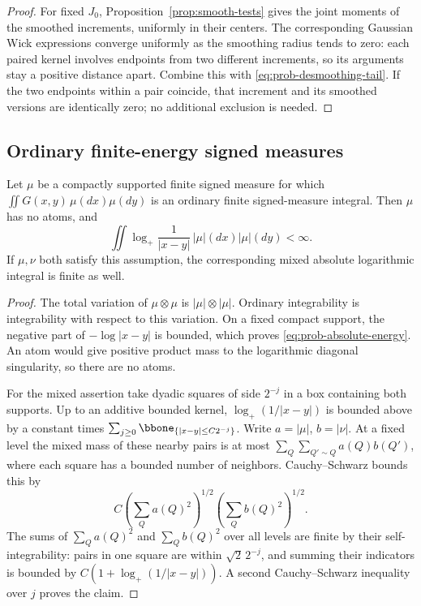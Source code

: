 \begin{proof}
For fixed \(J_0\), Proposition~\ref{prop:smooth-tests} gives the joint
moments of the smoothed increments, uniformly in their centers.
The corresponding Gaussian Wick expressions converge uniformly as the
smoothing radius tends to zero: each paired kernel involves endpoints
from two different increments, so its arguments stay a positive
distance apart. Combine this with \eqref{eq:prob-desmoothing-tail}.
If the two endpoints within a pair coincide, that increment and its
smoothed versions are identically zero; no additional exclusion is
needed.
\end{proof}

\subsection{Ordinary finite-energy signed measures}

\begin{lemma}\label{lem:log-integrability}
Let \(\mu\) be a compactly supported finite signed measure for which
\(\iint G(x,y)\,\mu(dx)\mu(dy)\) is an ordinary finite signed-measure
integral. Then \(\mu\) has no atoms, and
\begin{equation}\label{eq:prob-absolute-energy}
 \iint\log_+\frac1{|x-y|}\,|\mu|(dx)|\mu|(dy)<\infty.
\end{equation}
If \(\mu,\nu\) both satisfy this assumption, the corresponding mixed
absolute logarithmic integral is finite as well.
\end{lemma}

\begin{proof}
The total variation of \(\mu\otimes\mu\) is
\(|\mu|\otimes|\mu|\). Ordinary integrability is integrability with
respect to this variation. On a fixed compact support, the negative
part of \(-\log|x-y|\) is bounded, which proves
\eqref{eq:prob-absolute-energy}. An atom would give positive product
mass to the logarithmic diagonal singularity, so there are no atoms.

For the mixed assertion take dyadic squares of side \(2^{-j}\) in a
box containing both supports. Up to an additive bounded kernel,
\(\log_+(1/|x-y|)\) is bounded above by a constant times
\(\sum_{j\ge0}\bbone_{\{|x-y|\le C2^{-j}\}}\).
Write \(a=|\mu|\), \(b=|\nu|\).
At a fixed level the mixed mass of these nearby pairs is at most
\(\sum_Q\sum_{Q'\sim Q}a(Q)b(Q')\), where each square has a bounded
number of neighbors. Cauchy--Schwarz bounds this by
\[
 C\left(\sum_Qa(Q)^2\right)^{1/2}
  \left(\sum_Qb(Q)^2\right)^{1/2}.
\]
The sums of \(\sum_Qa(Q)^2\) and \(\sum_Qb(Q)^2\) over all levels
are finite by their self-integrability: pairs in one square are within
\(\sqrt2\,2^{-j}\), and summing their indicators is bounded by
\(C(1+\log_+(1/|x-y|))\).
A second Cauchy--Schwarz inequality over \(j\) proves the claim.
\end{proof}

